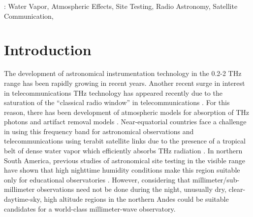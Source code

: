 \documentclass[12pt]{iopart}
\begin{document}
%
: Water Vapor, Atmospheric Effects, Site Testing, Radio Astronomy, Satellite Communication, \\
%
%
% 
%


\section{Introduction}

The development of astronomical instrumentation technology in the 0.2-2 THz range has been rapidly growing in recent years. Another recent surge in interest in telecommunications THz technology has appeared recently due to the saturation of the ``classical radio window'' in telecommunications  \cite{newera}. For this reason, there has been development of atmospheric models for absorption of THz photons \cite{rosenkranz,lababs} and artifact removal models \cite{removal}. Near-equatorial countries face a challenge in using this frequency band for astronomical observations and telecommunications using terabit satellite links  \cite{suen2016} due to the presence of a tropical belt of dense water vapor which efficiently absorbs THz radiation \cite{tropicalbelt}. In northern South America, previous studies of astronomical site testing in the visible range have shown that high nighttime humidity conditions make this region suitable only for educational observatories \cite{pinzon}. However, considering that millimeter/sub-millimeter observations need not be done during the night, unusually dry, clear-daytime-sky, high altitude regions in the northern Andes could be suitable candidates for a world-class millimeter-wave observatory. \\
\end{document}
